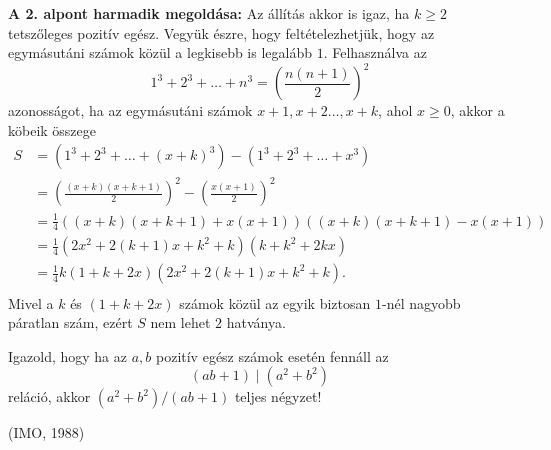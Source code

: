 \begin{solution}
%
\textbf{A 2. alpont harmadik megoldása:}
Az állítás akkor is igaz, ha $k\ge2$ tetszőleges pozitív egész.
Vegyük észre, hogy feltételezhetjük, hogy az egymásutáni számok közül
a legkisebb is legalább $1$. Felhasználva az 
\[
1^{3}+2^{3}+\dots+n^{3}=\left(\frac{n(n+1)}{2}\right)^{2}
\]
azonosságot, ha az egymásutáni számok $x+1,x+2\dots,x+k$, ahol $x\ge0$,
akkor a köbeik összege 
\begin{align*}
S & =\left(1^{3}+2^{3}+\dots+(x+k)^{3}\right)-\left(1^{3}+2^{3}+\dots+x^{3}\right)\\
 & =\left(\frac{(x+k)(x+k+1)}{2}\right)^{2}-\left(\frac{x(x+1)}{2}\right)^{2}\\
 & =\frac{1}{4}\left((x+k)(x+k+1)+x(x+1)\right)\left((x+k)(x+k+1)-x(x+1)\right)\\
 & =\frac{1}{4}\left(2x^{2}+2(k+1)x+k^{2}+k\right)\left(k+k^{2}+2kx\right)\\
 & =\frac{1}{4}k\left(1+k+2x\right)\left(2x^{2}+2(k+1)x+k^{2}+k\right).\\
\end{align*}
Mivel a $k$ és $(1+k+2x)$ számok közül az egyik biztosan $1$-nél
nagyobb páratlan szám, ezért $S$ nem lehet $2$ hatványa. 
\end{solution}

\begin{extraproblem}
Igazold, hogy ha az $a,b$ pozitív egész számok esetén fennáll az
\[
(ab+1)\mid(a^{2}+b^{2})
\]
reláció, akkor $(a^{2}+b^{2})/(ab+1)$ teljes négyzet! 
\begin{flushright}
(IMO, 1988) 
\par\end{flushright}
\end{extraproblem}

